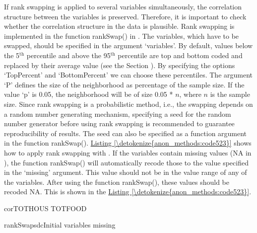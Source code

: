 \documentclass[letterpaper,10pt,english]{sphinxmanual}
\begin{document}
If rank swapping is applied to several variables simultaneously, the
correlation structure between the variables is preserved. Therefore, it
is important to check whether the correlation structure in the data is
plausible. Rank swapping is implemented in the function rankSwap() in
. The variables, which have to be swapped, should be specified
in the argument ‘variables’. By default, values below the 5$^{\text{th}}$
percentile and above the 95$^{\text{th}}$ percentile are top and bottom
coded and replaced by their average value (see the Section
). By specifying the options ‘TopPercent’ and
‘BottomPercent’ we can choose these percentiles. The argument ‘P’
defines the size of the neighborhood as percentage of the sample size.
If the value ‘p’ is 0.05, the neighborhood will be of size 0.05 *
\(n\), where \(n\) is the sample size. Since rank swapping is a
probabilistic method, i.e., the swapping depends on a random number
generating mechanism, specifying a seed for the random number generator
before using rank swapping is recommended to guarantee reproducibility
of results. The seed can also be specified as a function argument in the
function rankSwap(). \hyperref[\detokenize{anon_methods:code523}]{Listing \ref{\detokenize{anon_methods:code523}}} shows how to apply rank swapping with
. If the variables contain missing values (NA in ), the
function rankSwap() will automatically recode those to the value
specified in the ‘missing’ argument. This value should not be in the
value range of any of the variables. After using the function
rankSwap(), these values should be recoded NA. This is shown in the
\hyperref[\detokenize{anon_methods:code523}]{Listing \ref{\detokenize{anon_methods:code523}}}.

\def\sphinxLiteralBlockLabel{\label{\detokenize{anon_methods:code523}}}
%
\begin{sphinxVerbatim}[commandchars=\\\{\},numbers=left,firstnumber=1,stepnumber=1]
 corTOTHOUS TOTFOOD


 rankSwapsdcInitial variables    missing  
\end{sphinxVerbatim}
\end{document}

